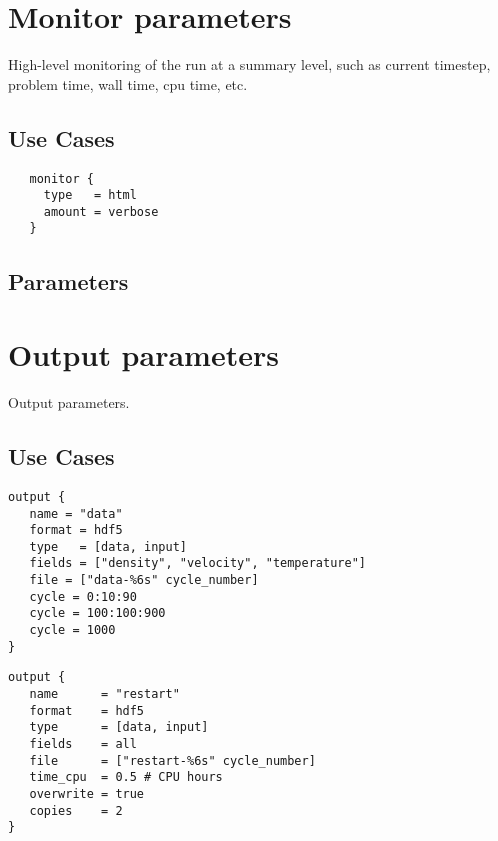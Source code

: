 \documentclass{book}
\begin{document}
\section{Monitor parameters} \label{s:monitor}

High-level monitoring of the run at a summary level, such as current
timestep, problem time, wall time, cpu time, etc.

\subsection{Use Cases}
\begin{verbatim}
   monitor {
     type   = html
     amount = verbose
   }
\end{verbatim}
\subsection{Parameters}

\section{Output parameters} \label{s:output}

Output parameters.

\subsection{Use Cases}

\begin{verbatim}
output { 
   name = "data"
   format = hdf5
   type   = [data, input]
   fields = ["density", "velocity", "temperature"]
   file = ["data-%6s" cycle_number]
   cycle = 0:10:90
   cycle = 100:100:900
   cycle = 1000
}
\end{verbatim}

\begin{verbatim}
output { 
   name      = "restart"
   format    = hdf5
   type      = [data, input]
   fields    = all
   file      = ["restart-%6s" cycle_number]
   time_cpu  = 0.5 # CPU hours
   overwrite = true
   copies    = 2
}
\end{verbatim}
\end{document}
